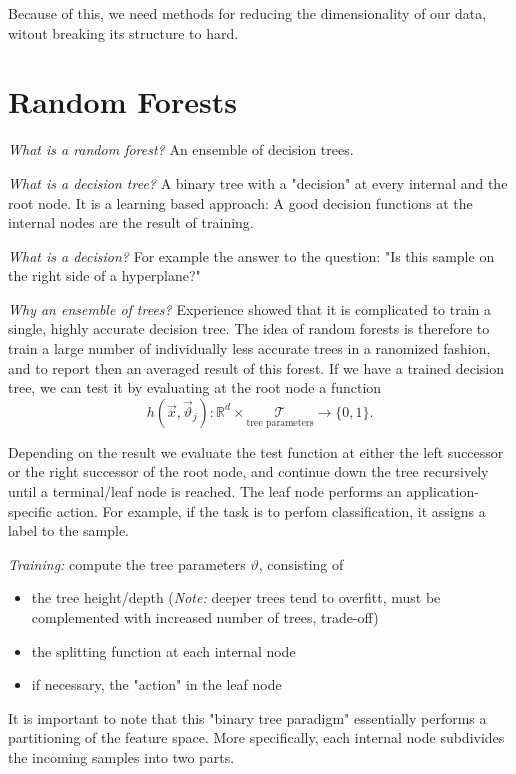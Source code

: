 \documentclass{scrartcl}
\begin{document}
Because of this, we need methods for reducing the dimensionality of our data, witout breaking its structure to hard.

\section{Random Forests}
\textit{What is a random forest?} An ensemble of decision trees.

\textit{What is a decision tree?} A binary tree with a "decision" at every internal and the root node. It is a learning based approach: A good decision functions at the internal nodes are the result of training.

\textit{What is a decision?} For example the answer to the question: "Is this sample on the right side of a hyperplane?"

\textit{Why an ensemble of trees?} Experience showed that it is complicated to train a single, highly accurate decision tree. The idea of random forests is therefore to train a large number of individually less accurate trees in a ranomized fashion, and to report then an averaged result of this forest. 
If we have a trained decision tree, we can test it by evaluating at the root node a function
\[h(\vec{x}, \vec{\vartheta}_j): \mathbb{R}^d \times \underset{\text{tree parameters}}{\mathcal{T}} \rightarrow \{0, 1\}.\]

Depending on the result we evaluate the test function at either the left successor or the right successor of the root node, and continue down the tree recursively until a terminal/leaf node is reached.
The leaf node performs an application-specific action. For example, if the task is to perfom classification, it assigns a label to the sample.


\textit{Training:} compute the tree parameters \(\vartheta\), consisting of
\begin{itemize}
    \item
        the tree height/depth (\textit{Note:} deeper trees tend to overfitt, must be complemented with increased number of trees, trade-off)
    \item
        the splitting function at each internal node
    \item
        if necessary, the "action" in the leaf node
\end{itemize}

It is important to note that this "binary tree paradigm" essentially performs a partitioning of the feature space. More specifically, each internal node subdivides the incoming samples into two parts.
\end{document}
